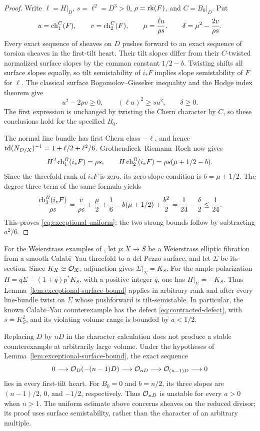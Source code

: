 \begin{proof}
Write \(\ell=H|_D\), \(s=\ell^2=D^3>0\),
\(\rho=\operatorname{rk}(F)\), and \(C=B_0|_D\).  Put
\[
 u=\operatorname{ch}_1^C(F),\qquad v=\operatorname{ch}_2^C(F),\qquad
 \mu=\frac{\ell u}{\rho s},\qquad
 \delta=\mu^2-\frac{2v}{\rho s}.
\]
Every exact sequence of sheaves on \(D\) pushes forward to an exact
sequence of torsion sheaves in the first-tilt heart.  Their tilt
slopes differ from their \(C\)-twisted normalized surface slopes by
the common constant \(1/2-b\).  Twisting shifts all surface slopes
equally, so tilt semistability of \(i_*F\) implies slope semistability
of \(F\) for \(\ell\).
The classical surface Bogomolov--Gieseker inequality
\cite[Theorem~3.1.4]{BMT2014} and the Hodge index theorem give
\[
 u^2-2\rho v\ge0,
 \qquad (\ell u)^2\ge s u^2,
 \qquad \delta\ge0.
\]
The first expression is unchanged by twisting the Chern character
by \(C\), so these conclusions hold for the specified \(B_0\).

The normal line bundle has first Chern class \(-\ell\), and hence
\(\operatorname{td}(N_{D/X})^{-1}=1+\ell/2+\ell^2/6\).
Grothendieck--Riemann--Roch now gives
\[
 H^2\operatorname{ch}_1^B(i_*F)=\rho s,
 \qquad
 H\operatorname{ch}_2^B(i_*F)=\rho s(\mu+1/2-b).
\]
Since the threefold rank of \(i_*F\) is zero, its zero-slope condition
is \(b=\mu+1/2\).  The degree-three term of the same formula yields
\[
 \frac{\operatorname{ch}_3^B(i_*F)}{\rho s}
 =\frac{v}{\rho s}+\frac\mu2+\frac16
   -b(\mu+1/2)+\frac{b^2}{2}
 =\frac1{24}-\frac\delta2\le\frac1{24}.
\]
This proves \eqref{eq:exceptional-uniform}; the two strong bounds
follow by subtracting \(a^2/6\).
\end{proof}

For the Weierstrass examples of
\cite[Section~3.2 and Appendix~A]{MartinezSchmidt2019}, let
\(p:X\to S\) be a Weierstrass elliptic fibration from a smooth
Calabi--Yau threefold to a del Pezzo surface, and let \(\Sigma\)
be its section.
Since \(K_X\simeq\mathcal O_X\), adjunction gives
\(\Sigma|_\Sigma=K_S\).  For the ample polarization
\(H=q\Sigma-(1+q)p^*K_S\), with a positive integer \(q\), one has
\(H|_\Sigma=-K_S\).  Thus
Lemma~\ref{lem:exceptional-surface-bound} applies in arbitrary rank
and after every line-bundle twist on \(\Sigma\) whose pushforward is
tilt-semistable.  In particular,
the known Calabi--Yau counterexample has the defect
\eqref{eq:contracted-defect}, with \(s=K_S^2\), and its violating
volume range is bounded by \(a<1/2\).

\begin{remark}
\label{rem:nonreduced-multiple}
Replacing \(D\) by \(nD\) in the character calculation does not
produce a stable counterexample at arbitrarily large volume.  Under
the hypotheses of Lemma~\ref{lem:exceptional-surface-bound}, the exact
sequence
\[
 0\longrightarrow\mathcal O_D(-(n-1)D)\longrightarrow\mathcal O_{nD}
 \longrightarrow\mathcal O_{(n-1)D}\longrightarrow0
\]
lies in every first-tilt heart.  For \(B_0=0\) and \(b=n/2\), its
three slopes are \((n-1)/2\), \(0\), and \(-1/2\), respectively.
Thus \(\mathcal O_{nD}\) is unstable for every \(a>0\) when \(n>1\).
The uniform estimate above concerns sheaves on the reduced divisor;
its proof uses surface semistability, rather than the character of
an arbitrary multiple.
\end{remark}

